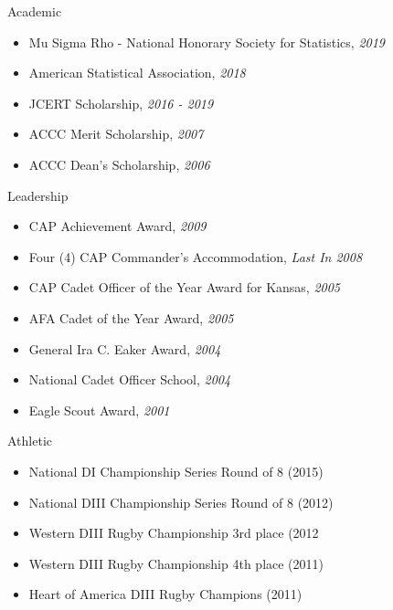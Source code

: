 
\Awards
{Academic}
{\begin{itemize}
    \item Mu Sigma Rho - National Honorary Society for Statistics, \emph{2019}
    \item American Statistical Association, \emph{2018}
    \item JCERT Scholarship, \emph{2016 - 2019}
    \item ACCC Merit Scholarship, \emph{2007}
    \item ACCC Dean’s Scholarship, \emph{2006}
\end{itemize}}

\vspace*{0.05 in}

\Awards
{Leadership}
{\begin{itemize}
    \item CAP Achievement Award, \emph{2009}
    \item Four (4) CAP Commander’s Accommodation, \emph{Last In 2008}
    \item CAP Cadet Officer of the Year Award for Kansas, \emph{2005}
    \item AFA Cadet of the Year Award, \emph{2005}
    \item General Ira C. Eaker Award, \emph{2004}
    \item National Cadet Officer School, \emph{2004}
    \item Eagle Scout Award, \emph{2001}
\end{itemize}}

\vspace*{0.05 in}

\Awards
{Athletic}
{\begin{itemize}
    \item National DI Championship Series Round of 8 (2015)
    \item National DIII Championship Series Round of 8 (2012)
    \item Western DIII Rugby Championship 3rd place (2012
    \item Western DIII Rugby Championship 4th place (2011)
    \item Heart of America DIII Rugby Champions (2011)
\end{itemize}}
